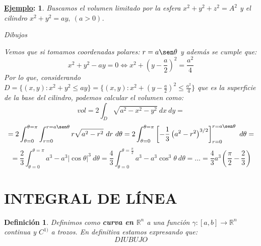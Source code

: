 \documentclass[10pt,a4paper,openright]{book}
\theoremstyle{break}
\newtheorem*{defi}{Definición}
\newtheorem*{ej}{\underline{Ejemplo}:}
\newcommand{\dif}[1]{\ d#1}
\begin{document}
\begin{ej}
Buscamos el volumen limitado por la esfera $x^2 + y^2 + z^2 = A^2$ y el cilindro $x^2 + y^2 = ay,\ \left(a > 0\right)$.

\textit{Dibujos}

Vemos que si tomamos coordenadas polares: $r = a\sen \theta$ y además se cumple que:
$$x^2 + y^2 - ay = 0 \Leftrightarrow x^2 + \left(y - \frac{a}{2}\right)^2 = \frac{a^2}{4}$$
Por lo que, considerando $D = \{\left(x, y\right): x^2 + y^2 \le ay\} = \{\left(x, y\right): x^2 + \left(y - \frac{a}{2}\right)^2 \le \frac{a^2}{4}\}$ que es la superficie de la base del cilindro, podemos calcular el volumen como: 
$$vol = 2 \int_{D} \sqrt{a^2 - x^2 - y^2} \dif{x} \dif{y} = $$
$$= 2 \int_{\theta = 0}^{\theta = \pi} \int_{r = 0}^{r = a\sen \theta } r \sqrt{a^2 - r^2} \dif{r} \dif{\theta} = 2 \int_{\theta = 0}^{\theta = \pi} \left[-\frac{1}{3} \left(a^2 - r^2 \right)^{3/2}\right]_{r = 0}^{r = a\sen \theta }\dif{\theta} = $$
$$= \frac{2}{3} \int_{\theta = 0}^{\theta = \pi} a^3 - a^3 \lvert \cos \theta  \rvert^3 \dif{\theta } = \frac{4}{3} \int_{\theta = 0}^{\theta = \frac{\pi}{2}} a^3 - a^3 \cos^3 \theta \dif{\theta } = \ldots = \boxed{\frac{4}{3}a^3 \left(\frac{\pi}{2} - \frac{2}{3}\right)} $$
\end{ej}

\chapter*{INTEGRAL DE LÍNEA}
\begin{defi}
Definimos como \textbf{curva en $\mathbb{R}^n$} a una función $\gamma: \left[ a, b \right] \rightarrow \mathbb{R}^n$ continua y $C^{1)}$ a trozos. En definitiva estamos expresando que:
$$DIUBUJO$$
\end{defi}
\end{document}
